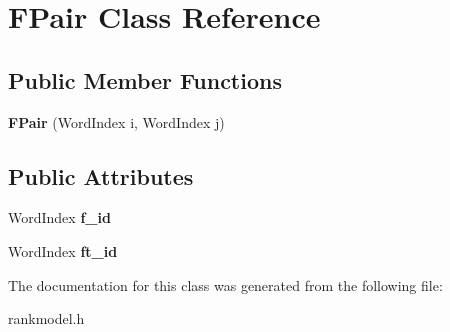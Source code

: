 \hypertarget{classFPair}{\section{\-F\-Pair \-Class \-Reference}
\label{classFPair}
}
\subsection*{\-Public \-Member \-Functions}
\begin{DoxyCompactItemize}
\item 
\hypertarget{classFPair_ababd07973c74284c38e4ee242c492a85}{{\bfseries \-F\-Pair} (\-Word\-Index i, \-Word\-Index j)}\label{classFPair_ababd07973c74284c38e4ee242c492a85}

\end{DoxyCompactItemize}
\subsection*{\-Public \-Attributes}
\begin{DoxyCompactItemize}
\item 
\hypertarget{classFPair_a8f53eca984f65246e18ffc24837ceed7}{\-Word\-Index {\bfseries f\-\_\-id}}\label{classFPair_a8f53eca984f65246e18ffc24837ceed7}

\item 
\hypertarget{classFPair_a62757ba5b880ba50f3932cf7b97f3737}{\-Word\-Index {\bfseries ft\-\_\-id}}\label{classFPair_a62757ba5b880ba50f3932cf7b97f3737}

\end{DoxyCompactItemize}


\-The documentation for this class was generated from the following file\-:\begin{DoxyCompactItemize}
\item 
rankmodel.\-h\end{DoxyCompactItemize}

